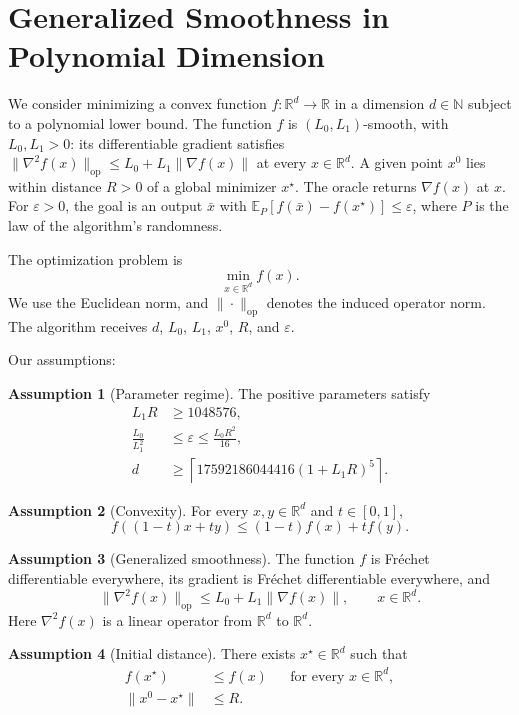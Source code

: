 \documentclass[10pt]{article}
\theoremstyle{definition}
\newtheorem{assumption}{Assumption}
\begin{document}
\section*{Generalized Smoothness in Polynomial Dimension}
We consider minimizing a convex function $f:\mathbb{R}^d\to\mathbb{R}$ in a dimension $d\in\mathbb{N}$ subject to a polynomial lower bound. The function $f$ is $(L_0,L_1)$-smooth, with $L_0,L_1>0$: its differentiable gradient satisfies $\|\nabla^2 f(x)\|_{\mathrm{op}}\leq L_0+L_1\|\nabla f(x)\|$ at every $x\in\mathbb{R}^d$. A given point $x^0$ lies within distance $R>0$ of a global minimizer $x^\star$. The oracle returns $\nabla f(x)$ at $x$. For $\varepsilon>0$, the goal is an output $\bar{x}$ with $\mathbb{E}_{P}[f(\bar{x})-f(x^\star)]\leq\varepsilon$, where $P$ is the law of the algorithm's randomness.

The optimization problem is
\[
\min_{x\in\mathbb{R}^d} f(x).
\]
We use the Euclidean norm, and $\|\cdot\|_{\mathrm{op}}$ denotes the induced operator norm. The algorithm receives $d$, $L_0$, $L_1$, $x^0$, $R$, and $\varepsilon$.

Our assumptions:
\begin{assumption}[Parameter regime]
The positive parameters satisfy
\[
\begin{aligned}
L_1R&\geq 1048576,\\
\frac{L_0}{L_1^2}&\leq\varepsilon
\leq\frac{L_0R^2}{16},\\
d&\geq\left\lceil 17592186044416(1+L_1R)^5\right\rceil.
\end{aligned}
\]
\end{assumption}

\begin{assumption}[Convexity]
For every $x,y\in\mathbb{R}^d$ and $t\in[0,1]$,
\[
f((1-t)x+ty)\leq (1-t)f(x)+t f(y).
\]
\end{assumption}

\begin{assumption}[Generalized smoothness]
The function $f$ is Fr\'echet differentiable everywhere, its gradient is Fr\'echet differentiable everywhere, and
\[
\|\nabla^2 f(x)\|_{\mathrm{op}}
\leq L_0+L_1\|\nabla f(x)\|,
\qquad x\in\mathbb{R}^d.
\]
Here $\nabla^2 f(x)$ is a linear operator from $\mathbb{R}^d$ to $\mathbb{R}^d$.
\end{assumption}

\begin{assumption}[Initial distance]
There exists $x^\star\in\mathbb{R}^d$ such that
\[
\begin{aligned}
f(x^\star)&\leq f(x)
&&\text{for every }x\in\mathbb{R}^d,\\
\|x^0-x^\star\|&\leq R.
\end{aligned}
\]
\end{assumption}
\end{document}
